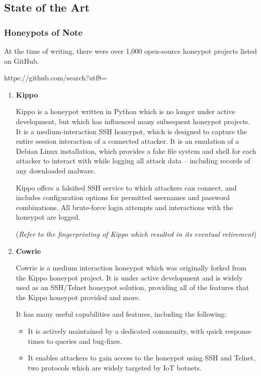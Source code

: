 \subsection{State of the Art}

\subsubsection{Honeypots of Note}

At the time of writing, there were over 1,000 open-source honeypot projects listed on GitHub. {https://github.com/search?utf8=%

\begin{enumerate}
	
	\item \textbf{Kippo}
	
	Kippo is a honeypot written in Python which is no longer under active development, but which has influenced many subsequent honeypot projects. It is a medium-interaction SSH honeypot, which is designed to capture the entire session interaction of a connected attacker. It is an emulation of a Debian Linux installation, which provides a fake file system and shell for each attacker to interact with while logging all attack data – including records of any downloaded malware. 
	
	Kippo offers a falsified SSH service to which attackers can connect, and includes configuration options for permitted usernames and password combinations. All brute-force login attempts and interactions with the honeypot are logged. 
	
	(\textit{Refer to the fingerprinting of Kippo which resulted in its eventual retirement})
	
	\item \textbf{Cowrie}
	
	Cowrie is a medium interaction honeypot which was originally forked from the Kippo honeypot project. It is under active development and is widely used as an SSH/Telnet honeypot solution, providing all of the features that the Kippo honeypot provided and more. 
	
	It has many useful capabilities and features, including the following:
	
	\begin{itemize}
		\item It is actively maintained by a dedicated community, with quick response times to queries and bug-fixes.
		
		\item It enables attackers to gain access to the honeypot using SSH and Telnet, two protocols which are widely targeted by IoT botnets.
		

\end{itemize}
\end{enumerate}}
